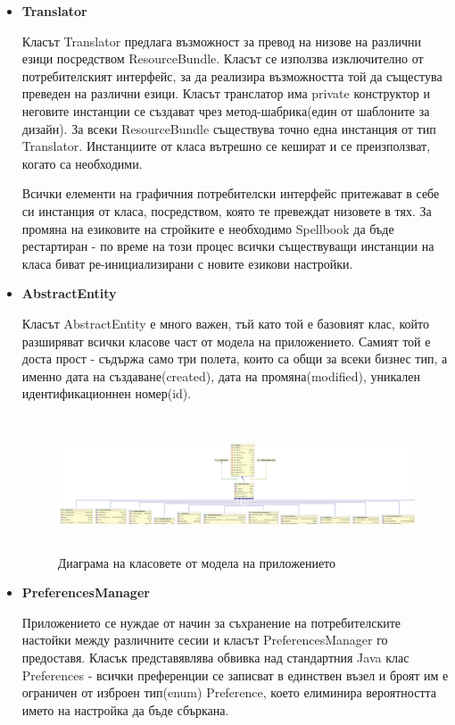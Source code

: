 \begin{itemize}
  \item \textbf{Translator}

    Класът Translator предлага възможност за превод на низове на
    различни езици посредством ResourceBundle. Класът се използва
    изключително от потребителският интерфейс, за да реализира
    възможността той да същестува преведен на различни
    езици. Класът транслатор има private конструктор и неговите
    инстанции се създават чрез метод-шабрика(един от шаблоните за
    дизайн). За всеки ResourceBundle съществува точно една инстанция
    от тип Translator. Инстанциите от класа вътрешно се кешират и се
    преизползват, когато са необходими.

    Всички елементи на графичния потребителски интерфейс притежават в
    себе си инстанция от класа, посредством, която те превеждат
    низовете в тях. За промяна на езиковите на стройките е необходимо
    Spellbook да бъде рестартиран - по време на този процес всички
    съществуващи инстанции на класа биват ре-инициализирани с новите
    езикови настройки.
   
  \item \textbf{AbstractEntity}

    Класът AbstractEntity е много важен, тъй като той е базовият клас,
    който разширяват всички класове част от модела на
    приложението. Самият той е доста прост - съдържа само три полета,
    които са общи за всеки бизнес тип, а именно дата на
    създаване(created), дата на промяна(modified), уникален
    идентификационнен номер(id).

\begin{figure}[htbp]
  \caption{Диаграма на класовете от модела на приложението}
  \centering
  \includegraphics[width=110mm, height=40mm]{images/model-diagram.png}
\end{figure}

  \item \textbf{PreferencesManager}

    Приложението се нуждае от начин за съхранение на потребителските
    настойки между различните сесии и класът PreferencesManager го
    предоставя. Класък представявлява обвивка над стандартния Java
    клас Preferences - всички преференции се записват в единствен
    възел и броят им е ограничен от изброен тип(enum) Preference,
    което елиминира вероятността името на настройка да бъде сбъркана.


\end{itemize}
